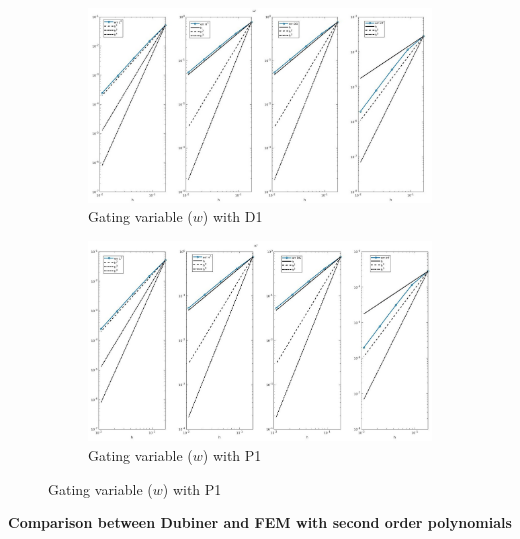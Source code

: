 \documentclass[a4paper,11pt]{article}
\begin{document}
\begin{figure}[H]
\caption{Comparison of the gating variable ($w$)}
\label{w_1}
\begin{subfigure}{\textwidth}
\begin{center}
\includegraphics[width = \textwidth]{./D1_w_1.jpg}
\caption{Gating variable ($w$) with D1}
\end{center}
\end{subfigure}
\begin{subfigure}{\textwidth}
\begin{center}
\includegraphics[width =\textwidth]{./P1_w_1.jpg}
\caption{Gating variable ($w$) with P1}
\end{center}
\end{subfigure}
\end{figure}
\newpage
\begin{center}
\textbf{Comparison between Dubiner and FEM with second order polynomials}
\end{center}
\end{document}
